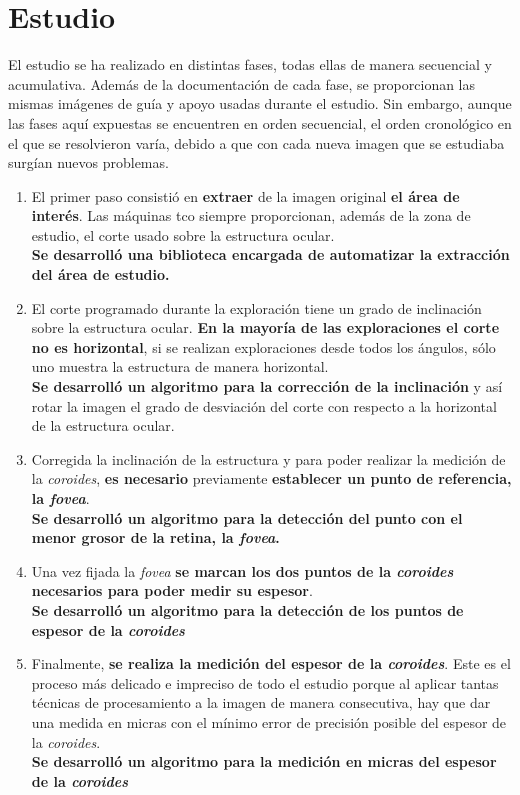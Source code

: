 \section{Estudio}
El estudio se ha realizado en distintas fases, todas ellas de manera
secuencial y acumulativa. Además de la documentación de cada fase, se
proporcionan las mismas imágenes de guía y apoyo usadas durante el
estudio.  Sin embargo, aunque las fases aquí expuestas se encuentren
en orden secuencial, el orden cronológico en el que se resolvieron
varía, debido a que con cada nueva imagen que se estudiaba surgían
nuevos problemas.
\begin{enumerate}
\item El primer paso consistió en \textbf{extraer} de la imagen
  original \textbf{el área de interés}. Las máquinas \gls{tco} siempre
  proporcionan, además
  de la zona de estudio, el corte usado sobre la estructura ocular. \\
  \textbf{Se desarrolló una biblioteca encargada de automatizar la
    extracción del área de estudio.}
\item El corte programado durante la exploración tiene un grado de
  inclinación sobre la estructura ocular. \textbf{En la mayoría de las
    exploraciones el corte no es horizontal}, si se realizan
  exploraciones desde todos los ángulos, sólo uno muestra la
  estructura
  de manera horizontal. \\
  \textbf{Se desarrolló un algoritmo para la corrección de la
    inclinación} y así rotar la imagen el grado de desviación del
  corte con respecto a la horizontal de la estructura ocular.
\item Corregida la inclinación de la estructura y para poder realizar
  la medición de la \emph{\gls{coroides}}, \textbf{es necesario}
  previamente
  \textbf{establecer un punto de referencia, la \emph{\gls{fovea}}}. \\
  \textbf{Se desarrolló un algoritmo para la detección del punto con
    el menor grosor de la retina, la \emph{\gls{fovea}}.}
\item Una vez fijada la \emph{\gls{fovea}} \textbf{se marcan los dos
    puntos
    de la \emph{\gls{coroides}} necesarios para poder medir su espesor}. \\
  \textbf{Se desarrolló un algoritmo para la detección de los puntos
    de espesor de la \emph{\gls{coroides}}}
\item Finalmente, \textbf{se realiza la medición del espesor de la
    \emph{\gls{coroides}}}. Este es el proceso más delicado e
  impreciso de todo el estudio porque al aplicar tantas técnicas de
  procesamiento a la imagen de manera consecutiva, hay que dar una
  medida en micras con el mínimo error de precisión posible del
  espesor de la \emph{\gls{coroides}}. \\
  \textbf{Se desarrolló un algoritmo para la medición en micras del
    espesor de la \emph{\gls{coroides}}}
\end{enumerate}

